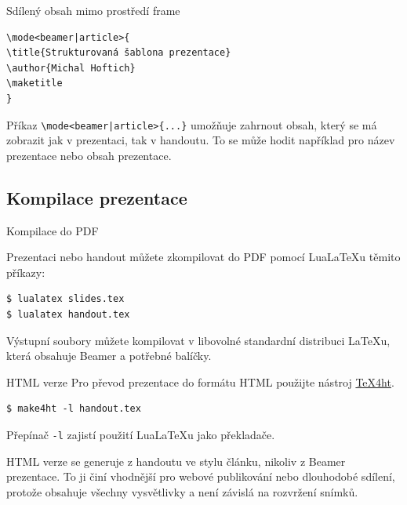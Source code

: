 \begin{frame}[fragile]{Sdílený obsah mimo prostředí frame}

\begin{verbatim}
\mode<beamer|article>{
\title{Strukturovaná šablona prezentace}
\author{Michal Hoftich}
\maketitle
}
\end{verbatim}
\end{frame}

Příkaz \verb+\mode<beamer|article>{...}+ umožňuje zahrnout obsah, který se má
zobrazit jak v prezentaci, tak v handoutu. To se může hodit například pro název
prezentace nebo obsah prezentace.

\subsection{Kompilace prezentace}

\begin{frame}[fragile]{Kompilace do PDF}

Prezentaci nebo handout můžete zkompilovat do PDF pomocí LuaLaTeXu těmito příkazy:

\begin{verbatim}
$ lualatex slides.tex
$ lualatex handout.tex
\end{verbatim}
\end{frame}



Výstupní soubory můžete kompilovat v libovolné standardní distribuci \LaTeX{}u, která obsahuje Beamer a potřebné balíčky.

\begin{frame}[fragile]{HTML verze}
Pro převod prezentace do formátu HTML použijte nástroj \href{https://www.tug.org/tex4ht/}{\TeX4ht}.
\begin{verbatim}
$ make4ht -l handout.tex\end{verbatim}

Přepínač \verb|-l| zajistí použití Lua\LaTeX{}u jako překladače.
\end{frame}

HTML verze se generuje z handoutu ve stylu článku, nikoliv z Beamer prezentace.
To ji činí vhodnější pro webové publikování nebo dlouhodobé sdílení, protože
obsahuje všechny vysvětlivky a není závislá na rozvržení snímků.

